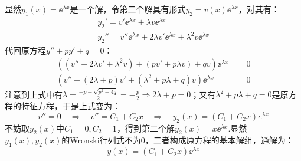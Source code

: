 \begin{enumerate}[circ]
    显然$y_1(x)= \ee^{\lambda x}$是一个解，令第二个解具有形式$y_2 = v(x)\ee^{\lambda x}$，对其有：
    \begin{gather*}
        y_2' = v'\ee^{\lambda x} + \lambda v \ee^{\lambda x}\\
        y_2'' = v''\ee^{\lambda x} + 2\lambda v' \ee^{\lambda x} + \lambda^2 v \ee^{\lambda x}
    \end{gather*}
    代回原方程$y'' + py' + q = 0$：
    \begin{align*}
        ((v'' + 2\lambda v' + \lambda^2 v) + (pv' + p\lambda v) + qv)\ee^{\lambda x} &= 0 \\
        (v'' + (2\lambda + p)v' + (\lambda^2 + p\lambda + q)v)\ee^{\lambda x} &= 0
    \end{align*}
    注意到上式中有$\lambda = \frac{-p \pm \sqrt{p^2 - 4q}}{2} = -\frac{p}{2} \Rightarrow 2\lambda + p = 0$；又有$\lambda^2 + p\lambda + q = 0$是原方程的特征方程，于是上式变为：
    \[v'' = 0 \quad\Rightarrow\quad v'' = C_1 + C_2 x \quad\Rightarrow\quad y_2(x) = (C_1 + C_2 x)e^{\lambda x}\]
    不妨取$y_2(x)$中$C_1 = 0,C_2 = 1$，得到第二个解$y_2(x) = x\ee^{\lambda x}$.显然$y_1(x),y_2(x)$的Wronski行列式不为$0$，二者构成原方程的基本解组，通解为：
    \[y(x) = (C_1 + C_2 x)\ee^{\lambda x}\]
\end{enumerate}